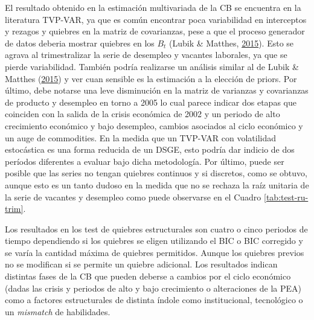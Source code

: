 \documentclass[12pt,oneside]{reedthesis}
\begin{document}
El resultado obtenido en la estimación multivariada de la CB se encuentra en la literatura TVP-VAR, ya que es común encontrar poca variabilidad en interceptos y rezagos y quiebres en la matriz de covarianzas, pese a que el proceso generador de datos deberia mostrar quiebres en los \(B_t\) (Lubik \& Matthes, \protect\hyperlink{ref-Lubik2016b}{2015}). Esto se agrava al trimestralizar la serie de desempleo y vacantes laborales, ya que se pierde variabilidad. También podría realizarse un análisis similar al de Lubik \& Matthes (\protect\hyperlink{ref-Lubik2016b}{2015}) y ver cuan sensible es la estimación a la elección de priors. Por último, debe notarse una leve disminución en la matriz de varianzas y covarianzas de producto y desempleo en torno a 2005 lo cual parece indicar dos etapas que coinciden con la salida de la crisis económica de 2002 y un periodo de alto crecimiento económico y bajo desempleo, cambios asociados al ciclo económico y un auge de commodities. En la medida que un TVP-VAR con volatilidad estocástica es una forma reducida de un DSGE, esto podría dar indicio de dos períodos diferentes a evaluar bajo dicha metodología. Por último, puede ser posible que las series no tengan quiebres continuos y si discretos, como se obtuvo, aunque esto es un tanto dudoso en la medida que no se rechaza la raíz unitaria de la serie de vacantes y desempleo como puede observarse en el Cuadro \ref{tab:test-ru-trim}.

Los resultados en los test de quiebres estructurales son cuatro o cinco periodos de tiempo dependiendo si los quiebres se eligen utilizando el BIC o BIC corregido y se varía la cantidad máxima de quiebres permitidos. Aunque los quiebres previos no se modifican si se permite un quiebre adicional. Los resultados indican distintas fases de la CB que pueden deberse a cambios por el ciclo económico (dadas las crisis y periodos de alto y bajo crecimiento o alteraciones de la PEA) como a factores estructurales de distinta índole como institucional, tecnológico o un \emph{mismatch} de habilidades.
\end{document}
